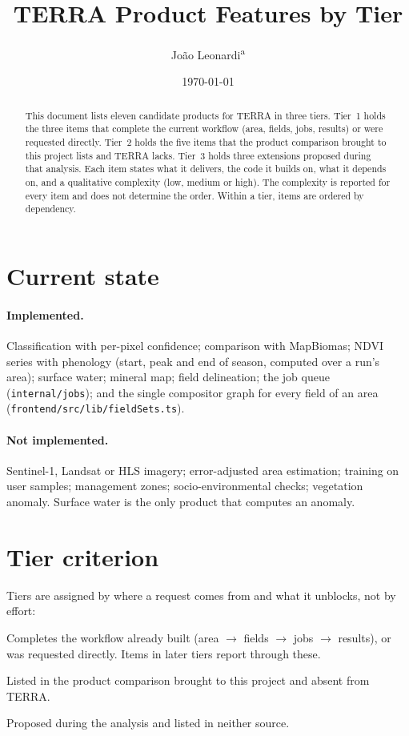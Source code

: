 \documentclass[11pt,a4paper]{article}
\title{TERRA Product Features by Tier}
\author{Jo\~ao Leonardi\textsuperscript{a}}
\date{\today}
\makeatletter
\renewcommand{\maketitle}{%
  \begin{center}
    {\LARGE\bfseries\@title\par}
    \vspace{0.8em}
    {\large\@author\par}
    \vspace{0.3em}
    {\small\itshape\@address\par}
    \vspace{0.3em}
    {\small\@date\par}
  \end{center}
  \vspace{0.8em}}
\makeatother
\begin{document}
\maketitle

\begin{abstract}
\noindent
This document lists eleven candidate products for TERRA in three tiers. Tier~1
holds the three items that complete the current workflow (area, fields, jobs,
results) or were requested directly. Tier~2 holds the five items that the
product comparison brought to this project lists and TERRA lacks. Tier~3 holds
three extensions proposed during that analysis. Each item states what it
delivers, the code it builds on, what it depends on, and a qualitative
complexity (low, medium or high). The complexity is reported for every item and
does not determine the order. Within a tier, items are ordered by dependency.
\end{abstract}

\section{Current state}

\paragraph{Implemented.} Classification with per-pixel confidence; comparison
with MapBiomas; NDVI series with phenology (start, peak and end of season,
computed over a run's area); surface water; mineral map; field delineation;
the job queue (\texttt{internal/jobs}); and the single compositor graph for
every field of an area (\texttt{frontend/src/lib/fieldSets.ts}).

\paragraph{Not implemented.} Sentinel-1, Landsat or HLS imagery; error-adjusted
area estimation; training on user samples; management zones;
socio-environmental checks; vegetation anomaly. Surface water is the only
product that computes an anomaly.

\section{Tier criterion}

Tiers are assigned by where a request comes from and what it unblocks, not by
effort:

\begin{description}[leftmargin=1.6cm, style=nextline]
  \item[Tier 1] Completes the workflow already built (area $\rightarrow$
    fields $\rightarrow$ jobs $\rightarrow$ results), or was requested
    directly. Items in later tiers report through these.
  \item[Tier 2] Listed in the product comparison brought to this project and
    absent from TERRA.
  \item[Tier 3] Proposed during the analysis and listed in neither source.
\end{description}
\end{document}
